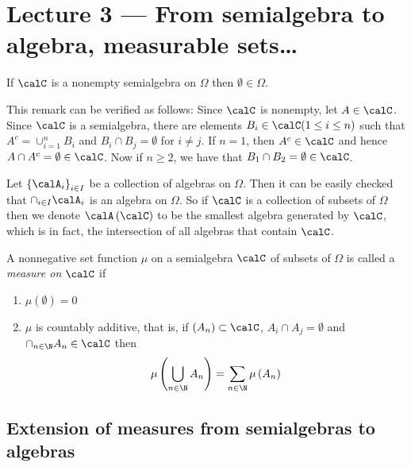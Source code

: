\section{Lecture 3 --- From semialgebra to algebra, measurable sets\ldots }

\begin{remark}
    If $\calC$ is a nonempty semialgebra on $\Omega$ then $\emptyset \in \Omega$.

    This remark can be verified as follows: Since $\calC$ is nonempty, let $A\in\calC$. Since $\calC$ is a semialgebra, there are elements $B_i \in \calC (1\le i \le n)$ such that $A^c = \cup_{i=1}^{n} B_i$ and $B_i \cap B_j = \emptyset$ for $i\ne j$. If $n=1$, then $A^c \in \calC$ and hence $A\cap A^c = \emptyset \in \calC$. Now if $n\ge 2$, we have that $B_1 \cap B_2 = \emptyset \in \calC$.
    \label{rem:empty-in-semialgebra}
\end{remark}

\begin{remark}
    Let $\left\{ \calA _i \right\}_{i \in I}$ be a collection of algebras on $\Omega$. Then it can be easily checked that $\cap_{i\in I} \calA _i$ is an algebra on $\Omega$. So if $\calC$ is a collection of subsets of $\Omega$ then we denote $\calA \left( \calC \right)$ to be the smallest algebra generated by $\calC$, which is in fact, the intersection of all algebras that contain $\calC$.
    \label{rem:smallest-algebra}
\end{remark}

\begin{definition}
    A nonnegative set function $\mu$ on a semialgebra $\calC$ of subsets of $\Omega$ is called a \textit{measure on $\calC$} if
    \begin{enumerate}[label= (\roman*)]
	\item $\mu (\emptyset ) = 0$
	\item $\mu$ is countably additive, that is, if $\left( A_n \right) \subset \calC$, $A_i \cap A_j = \emptyset$ and $\cap_{n\in \N} A_n \in \calC$ then 
	    \begin{equation*}
		\mu \left( \bigcup_{n\in \N} A_n \right) = \sum_{n\in \N} \mu \left( A_n \right)
		    \end{equation*}

    \end{enumerate}
    \label{def:measure-on-semialgebra}
\end{definition}

\subsection{Extension of measures from semialgebras to algebras}

